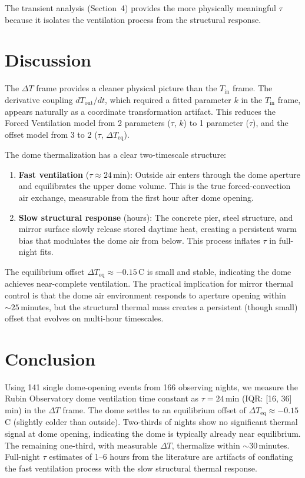 \documentclass[11pt]{article}
\begin{document}
The transient analysis (Section~4) provides the more physically meaningful $\tau$ because it isolates the ventilation process from the structural response.

\section{Discussion}

The $\Delta T$ frame provides a cleaner physical picture than the $T_\mathrm{in}$ frame. The derivative coupling $dT_\mathrm{out}/dt$, which required a fitted parameter $k$ in the $T_\mathrm{in}$ frame, appears naturally as a coordinate transformation artifact. This reduces the Forced Ventilation model from 2 parameters ($\tau$, $k$) to 1 parameter ($\tau$), and the offset model from 3 to 2 ($\tau$, $\Delta T_\mathrm{eq}$).

The dome thermalization has a clear two-timescale structure:
\begin{enumerate}
    \item \textbf{Fast ventilation} ($\tau \approx 24$\,min): Outside air enters through the dome aperture and equilibrates the upper dome volume. This is the true forced-convection air exchange, measurable from the first hour after dome opening.
    \item \textbf{Slow structural response} (hours): The concrete pier, steel structure, and mirror surface slowly release stored daytime heat, creating a persistent warm bias that modulates the dome air from below. This process inflates $\tau$ in full-night fits.
\end{enumerate}

The equilibrium offset $\Delta T_\mathrm{eq} \approx -0.15$\,\textdegree C is small and stable, indicating the dome achieves near-complete ventilation. The practical implication for mirror thermal control is that the dome air environment responds to aperture opening within $\sim 25$\,minutes, but the structural thermal mass creates a persistent (though small) offset that evolves on multi-hour timescales.

\section{Conclusion}

Using 141 single dome-opening events from 166 observing nights, we measure the Rubin Observatory dome ventilation time constant as $\tau = 24$\,min (IQR: [16, 36]\,min) in the $\Delta T$ frame. The dome settles to an equilibrium offset of $\Delta T_\mathrm{eq} \approx -0.15$\,\textdegree C (slightly colder than outside). Two-thirds of nights show no significant thermal signal at dome opening, indicating the dome is typically already near equilibrium. The remaining one-third, with measurable $\Delta T$, thermalize within $\sim 30$\,minutes. Full-night $\tau$ estimates of 1--6 hours from the literature are artifacts of conflating the fast ventilation process with the slow structural thermal response.
\end{document}
